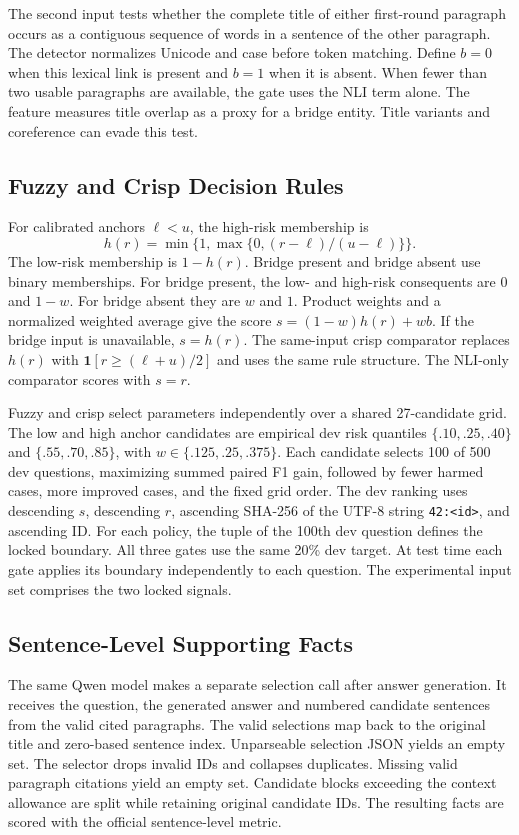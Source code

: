 The second input tests whether the complete title of either first-round paragraph occurs as a contiguous sequence of words in a sentence of the other paragraph. The detector normalizes Unicode and case before token matching. Define $b=0$ when this lexical link is present and $b=1$ when it is absent. When fewer than two usable paragraphs are available, the gate uses the NLI term alone. The feature measures title overlap as a proxy for a bridge entity. Title variants and coreference can evade this test.

\subsection{Fuzzy and Crisp Decision Rules}
For calibrated anchors $\ell<u$, the high-risk membership is
\begin{equation}
  h(r)=\min\{1,\max\{0,(r-\ell)/(u-\ell)\}\}.
\end{equation}
The low-risk membership is $1-h(r)$. Bridge present and bridge absent use binary memberships. For bridge present, the low- and high-risk consequents are $0$ and $1-w$. For bridge absent they are $w$ and $1$. Product weights and a normalized weighted average give the score $s=(1-w)h(r)+wb$. If the bridge input is unavailable, $s=h(r)$. The same-input crisp comparator replaces $h(r)$ with $\mathbf{1}[r\geq(\ell+u)/2]$ and uses the same rule structure. The NLI-only comparator scores with $s=r$.

Fuzzy and crisp select parameters independently over a shared 27-candidate grid. The low and high anchor candidates are empirical dev risk quantiles $\{.10,.25,.40\}$ and $\{.55,.70,.85\}$, with $w\in\{.125,.25,.375\}$. Each candidate selects 100 of 500 dev questions, maximizing summed paired F1 gain, followed by fewer harmed cases, more improved cases, and the fixed grid order. The dev ranking uses descending $s$, descending $r$, ascending SHA-256 of the UTF-8 string \texttt{42:\textless id\textgreater}, and ascending ID. For each policy, the tuple of the 100th dev question defines the locked boundary. All three gates use the same 20\% dev target. At test time each gate applies its boundary independently to each question. The experimental input set comprises the two locked signals.

\subsection{Sentence-Level Supporting Facts}
The same Qwen model makes a separate selection call after answer generation. It receives the question, the generated answer and numbered candidate sentences from the valid cited paragraphs. The valid selections map back to the original title and zero-based sentence index. Unparseable selection JSON yields an empty set. The selector drops invalid IDs and collapses duplicates. Missing valid paragraph citations yield an empty set. Candidate blocks exceeding the context allowance are split while retaining original candidate IDs. The resulting facts are scored with the official sentence-level metric.

